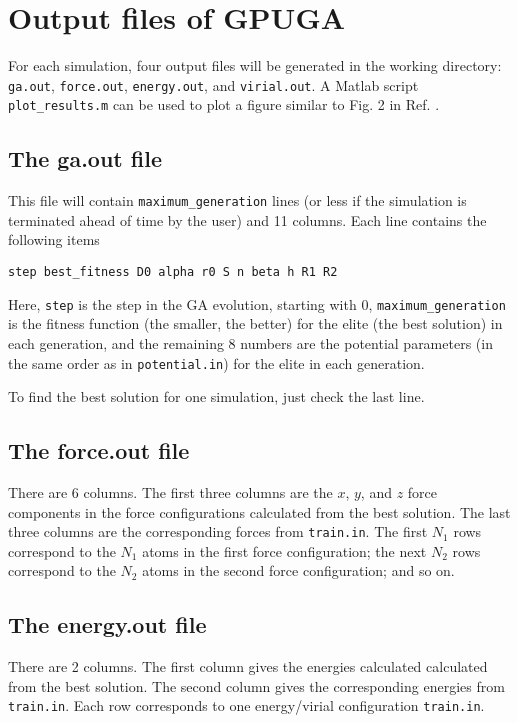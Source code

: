 \documentclass[12pt,a4paper]{report}
\begin{document}
\section{Output files of GPUGA}

For each simulation, four output files will be generated in the working directory: \verb"ga.out", \verb"force.out", \verb"energy.out", and \verb"virial.out". A Matlab script \verb"plot_results.m" can be used to plot a figure similar to Fig. 2 in Ref. \cite{fan2019arxiv}.

\subsection{The ga.out file}

This file will contain \verb"maximum_generation" lines (or less if the simulation is terminated ahead of time by the user) and 11 columns. Each line contains the following items
\begin{verbatim}
step best_fitness D0 alpha r0 S n beta h R1 R2
\end{verbatim}
Here, \verb"step" is the step in the GA evolution, starting with 0, \verb"maximum_generation" is the fitness function (the smaller, the better) for the elite (the best solution) in each generation, and the remaining 8 numbers are the potential parameters (in the same order as in \verb"potential.in") for the elite in each generation.

To find the best solution for one simulation, just check the last line.

\subsection{The force.out file}

There are 6 columns. The first three columns are the $x$, $y$, and $z$ force components in the force configurations calculated from the best solution. The last three columns are the corresponding forces from \verb"train.in". The first $N_1$ rows correspond to the $N_1$ atoms in the first force configuration; the next $N_2$ rows correspond to the $N_2$ atoms in the second force configuration; and so on.

\subsection{The energy.out file}

There are 2 columns. The first column gives the energies calculated calculated from the best solution. The second column gives the corresponding energies from \verb"train.in". Each row corresponds to one energy/virial configuration \verb"train.in".
\end{document}
